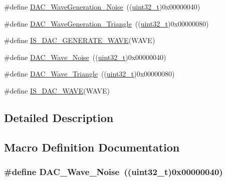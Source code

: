 \begin{DoxyCompactItemize}
\item 
\#define \hyperlink{group___d_a_c__wave__generation_ga1692990325098cae6f32182c1fa0f61e}{D\+A\+C\+\_\+\+Wave\+Generation\+\_\+\+Noise}~((\hyperlink{_p_e___types_8h_a33594304e786b158f3fb30289278f5af}{uint32\+\_\+t})0x00000040)
\item 
\#define \hyperlink{group___d_a_c__wave__generation_ga68f1a71011437a5ea6298ab039554714}{D\+A\+C\+\_\+\+Wave\+Generation\+\_\+\+Triangle}~((\hyperlink{_p_e___types_8h_a33594304e786b158f3fb30289278f5af}{uint32\+\_\+t})0x00000080)
\item 
\#define \hyperlink{group___d_a_c__wave__generation_ga50fb2dd12305cd7bd0b738a1f6388d3c}{I\+S\+\_\+\+D\+A\+C\+\_\+\+G\+E\+N\+E\+R\+A\+T\+E\+\_\+\+W\+A\+VE}(W\+A\+VE)
\item 
\#define \hyperlink{group___d_a_c__wave__generation_ga09c5ee68f8e726b1c039df1f6e195965}{D\+A\+C\+\_\+\+Wave\+\_\+\+Noise}~((\hyperlink{_p_e___types_8h_a33594304e786b158f3fb30289278f5af}{uint32\+\_\+t})0x00000040)
\item 
\#define \hyperlink{group___d_a_c__wave__generation_ga95a1566e1728e1e345e8f3b50629a075}{D\+A\+C\+\_\+\+Wave\+\_\+\+Triangle}~((\hyperlink{_p_e___types_8h_a33594304e786b158f3fb30289278f5af}{uint32\+\_\+t})0x00000080)
\item 
\#define \hyperlink{group___d_a_c__wave__generation_ga45c25065fb713820f6dbae0009376e1c}{I\+S\+\_\+\+D\+A\+C\+\_\+\+W\+A\+VE}(W\+A\+VE)
\end{DoxyCompactItemize}


\subsection{Detailed Description}


\subsection{Macro Definition Documentation}
\subsubsection[{\texorpdfstring{D\+A\+C\+\_\+\+Wave\+\_\+\+Noise}{DAC_Wave_Noise}}]{\setlength{\rightskip}{0pt plus 5cm}\#define D\+A\+C\+\_\+\+Wave\+\_\+\+Noise~(({\bf uint32\+\_\+t})0x00000040)}\hypertarget{group___d_a_c__wave__generation_ga09c5ee68f8e726b1c039df1f6e195965}{}\label{group___d_a_c__wave__generation_ga09c5ee68f8e726b1c039df1f6e195965}


